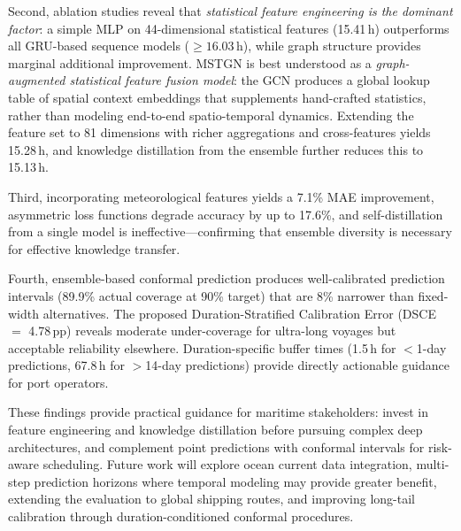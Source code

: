 \documentclass[conference]{IEEEtran}
\begin{document}
Second, ablation studies reveal that \textit{statistical feature engineering is the dominant factor}: a simple MLP on 44-dimensional statistical features (15.41\,h) outperforms all GRU-based sequence models (${\geq}16.03$\,h), while graph structure provides marginal additional improvement.
MSTGN is best understood as a \textit{graph-augmented statistical feature fusion model}: the GCN produces a global lookup table of spatial context embeddings that supplements hand-crafted statistics, rather than modeling end-to-end spatio-temporal dynamics.
Extending the feature set to 81 dimensions with richer aggregations and cross-features yields 15.28\,h, and knowledge distillation from the ensemble further reduces this to 15.13\,h.

Third, incorporating meteorological features yields a 7.1\% MAE improvement, asymmetric loss functions degrade accuracy by up to 17.6\%, and self-distillation from a single model is ineffective---confirming that ensemble diversity is necessary for effective knowledge transfer.

Fourth, ensemble-based conformal prediction produces well-calibrated prediction intervals (89.9\% actual coverage at 90\% target) that are 8\% narrower than fixed-width alternatives.
The proposed Duration-Stratified Calibration Error (DSCE $=$ 4.78\,pp) reveals moderate under-coverage for ultra-long voyages but acceptable reliability elsewhere.
Duration-specific buffer times (1.5\,h for $<$1-day predictions, 67.8\,h for $>$14-day predictions) provide directly actionable guidance for port operators.

These findings provide practical guidance for maritime stakeholders: invest in feature engineering and knowledge distillation before pursuing complex deep architectures, and complement point predictions with conformal intervals for risk-aware scheduling.
Future work will explore ocean current data integration, multi-step prediction horizons where temporal modeling may provide greater benefit, extending the evaluation to global shipping routes, and improving long-tail calibration through duration-conditioned conformal procedures.
\end{document}
